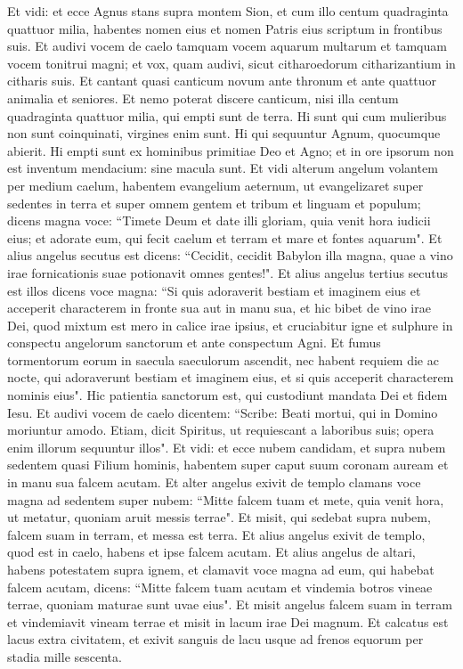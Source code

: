 \begin{biblechapter}  
\verse Et vidi: et ecce Agnus stans supra montem Sion, et cum illo centum quadraginta quattuor milia, habentes nomen eius et nomen Patris eius scriptum in frontibus suis. 
\verse Et audivi vocem de caelo tamquam vocem aquarum multarum et tamquam vocem tonitrui magni; et vox, quam audivi, sicut citharoedorum citharizantium in citharis suis. 
\verse Et cantant quasi canticum novum ante thronum et ante quattuor animalia et seniores. Et nemo poterat discere canticum, nisi illa centum quadraginta quattuor milia, qui empti sunt de terra. 
\verse Hi sunt qui cum mulieribus non sunt coinquinati, virgines enim sunt. Hi qui sequuntur Agnum, quocumque abierit. Hi empti sunt ex hominibus primitiae Deo et Agno; 
\verse et in ore ipsorum non est inventum mendacium: sine macula sunt. 
\verse Et vidi alterum angelum volantem per medium caelum, habentem evangelium aeternum, ut evangelizaret super sedentes in terra et super omnem gentem et tribum et linguam et populum; 
\verse dicens magna voce: “Timete Deum et date illi gloriam, quia venit hora iudicii eius; et adorate eum, qui fecit caelum et terram et mare et fontes aquarum". 
\verse Et alius angelus secutus est dicens: “Cecidit, cecidit Babylon illa magna, quae a vino irae fornicationis suae potionavit omnes gentes!". 
\verse Et alius angelus tertius secutus est illos dicens voce magna: “Si quis adoraverit bestiam et imaginem eius et acceperit characterem in fronte sua aut in manu sua, 
\verse et hic bibet de vino irae Dei, quod mixtum est mero in calice irae ipsius, et cruciabitur igne et sulphure in conspectu angelorum sanctorum et ante conspectum Agni. 
\verse Et fumus tormentorum eorum in saecula saeculorum ascendit, nec habent requiem die ac nocte, qui adoraverunt bestiam et imaginem eius, et si quis acceperit characterem nominis eius". 
\verse Hic patientia sanctorum est, qui custodiunt mandata Dei et fidem Iesu. 
\verse Et audivi vocem de caelo dicentem: “Scribe: Beati mortui, qui in Domino moriuntur amodo. Etiam, dicit Spiritus, ut requiescant a laboribus suis; opera enim illorum sequuntur illos". 
\verse Et vidi: et ecce nubem candidam, et supra nubem sedentem quasi Filium hominis, habentem super caput suum coronam auream et in manu sua falcem acutam. 
\verse Et alter angelus exivit de templo clamans voce magna ad sedentem super nubem: “Mitte falcem tuam et mete, quia venit hora, ut metatur, quoniam aruit messis terrae". 
\verse Et misit, qui sedebat supra nubem, falcem suam in terram, et messa est terra. 
\verse Et alius angelus exivit de templo, quod est in caelo, habens et ipse falcem acutam. 
\verse Et alius angelus de altari, habens potestatem supra ignem, et clamavit voce magna ad eum, qui habebat falcem acutam, dicens: “Mitte falcem tuam acutam et vindemia botros vineae terrae, quoniam maturae sunt uvae eius". 
\verse Et misit angelus falcem suam in terram et vindemiavit vineam terrae et misit in lacum irae Dei magnum. 
\verse Et calcatus est lacus extra civitatem, et exivit sanguis de lacu usque ad frenos equorum per stadia mille sescenta. 
\end{biblechapter}


